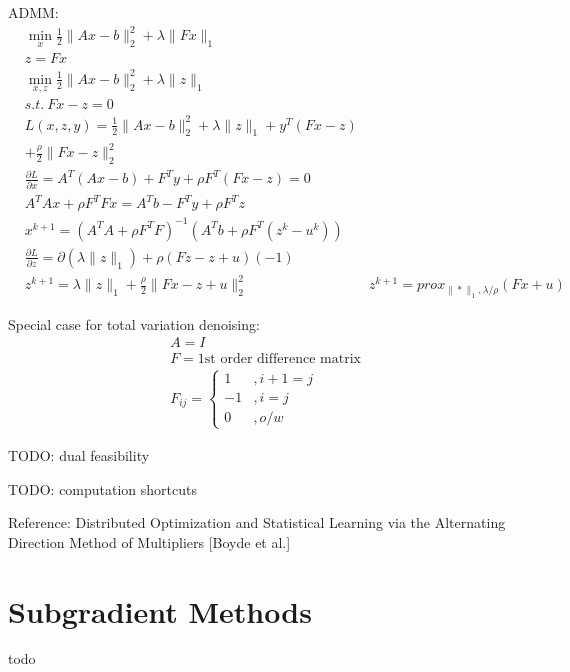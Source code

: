 \message{ !name(notebook.tex)}\documentclass[8pt]{report}
\newcommand{\norm}[1]{\|#1\|}
\begin{document}
\begin{multicols*}{2}
  ADMM:
  \begin{align*}
    &\min_x \frac{1}{2}\norm{Ax-b}_2^2 + \lambda \norm{Fx}_1\\
    &z=Fx\\
    &\min_{x,z} \frac{1}{2}\norm{Ax-b}_2^2 + \lambda \norm{z}_1\\
    &s.t.\ Fx-z=0\\
    &L(x,z,y) = \frac{1}{2}\norm{Ax-b}_2^2 + \lambda \norm{z}_1 + y^T(Fx-z)\\
    &+ \frac{\rho}{2}\norm{Fx-z}_2^2\\
    &\frac{\partial L}{\partial x} = A^T(Ax-b) + F^T y + \rho F^T(Fx-z)=0\\
    &A^T Ax + \rho F^TFx = A^T b - F^T y + \rho F^T z\\
    &x^{k+1} = (A^T A + \rho F^T F)^{-1}(A^T b + \rho F^T (z^k-u^k))\\
    &\frac{\partial L}{\partial z} = \partial (\lambda \norm{z}_1) + \rho(Fz-z+u)(-1)\\
    &z^{k+1} = \lambda \norm{z}_1 + \frac{\rho}{2} \norm{Fx-z+u}_2^2
    &z^{k+1} = prox_{\norm{*}_1, \lambda/\rho} (Fx+u)
  \end{align*}
    
  Special case for total variation denoising:
  \begin{align*}
    &A=I\\
    &F=\text{1st order difference matrix}\\
    &F_{ij}=
      \begin{cases}
        1 &, i+1=j\\
        -1&, i=j\\
        0&, o/w
      \end{cases}
  \end{align*}
  
  TODO: dual feasibility
  
  TODO: computation shortcuts
  
  Reference: Distributed Optimization and Statistical Learning via the Alternating Direction Method of Multipliers [Boyde et al.]
  
  \vfill\null
  
  \pagebreak

  \section{Subgradient Methods}

  todo

  \vfill\null
  

\end{multicols*}
\end{document}
